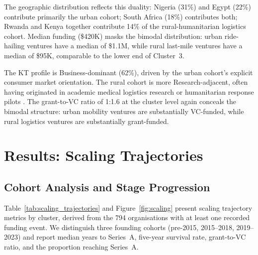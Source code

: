 \documentclass[review,12pt]{elsarticle}
\begin{document}
The geographic distribution reflects this duality: Nigeria (31\%) and
Egypt (22\%) contribute primarily the urban cohort; South Africa
(18\%) contributes both; Rwanda and Kenya together contribute 14\%
of the rural-humanitarian logistics cohort. Median funding (\$420K)
masks the bimodal distribution: urban ride-hailing ventures have a
median of \$1.1M, while rural last-mile ventures have a median of
\$95K, comparable to the lower end of Cluster~3.

The KT profile is Business-dominant (62\%), driven by the urban
cohort's explicit consumer market orientation. The rural cohort is
more Research-adjacent, often having originated in academic medical
logistics research or humanitarian response pilots
\citep{schot2018three}. The grant-to-VC ratio of 1:1.6 at the cluster
level again conceals the bimodal structure: urban mobility ventures
are substantially VC-funded, while rural logistics ventures are
substantially grant-funded.


\section{Results: Scaling Trajectories}
\label{sec:trajectories}

\subsection{Cohort Analysis and Stage Progression}

Table~\ref{tab:scaling_trajectories} and Figure~\ref{fig:scaling}
present scaling trajectory metrics by cluster, derived from the 794
organisations with at least one recorded funding event. We
distinguish three founding cohorts (pre-2015, 2015--2018,
2019--2023) and report median years to Series~A, five-year survival
rate, grant-to-VC ratio, and the proportion reaching Series~A.
\end{document}
